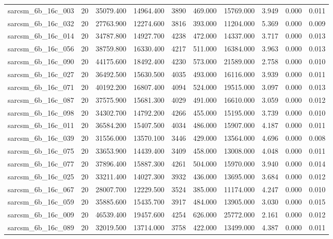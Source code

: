 \begin{tabular}{lrrrrrrrrr}
sarcsm\_6b\_16c\_003 & 20 & 35079.400 & 14964.400 & 3890 & 469.000 & 15769.000 & 3.949 & 0.000 & 0.011 \\
sarcsm\_6b\_16c\_032 & 20 & 27763.900 & 12274.600 & 3816 & 393.000 & 11204.000 & 5.369 & 0.000 & 0.009 \\
sarcsm\_6b\_16c\_014 & 20 & 34787.800 & 14927.700 & 4238 & 472.000 & 14337.000 & 3.717 & 0.000 & 0.013 \\
sarcsm\_6b\_16c\_056 & 20 & 38759.800 & 16330.400 & 4217 & 511.000 & 16384.000 & 3.963 & 0.000 & 0.013 \\
sarcsm\_6b\_16c\_090 & 20 & 44175.600 & 18492.400 & 4230 & 573.000 & 21589.000 & 2.758 & 0.000 & 0.010 \\
sarcsm\_6b\_16c\_027 & 20 & 36492.500 & 15630.500 & 4035 & 493.000 & 16116.000 & 3.939 & 0.000 & 0.011 \\
sarcsm\_6b\_16c\_071 & 20 & 40192.200 & 16807.400 & 4094 & 524.000 & 19515.000 & 3.097 & 0.000 & 0.013 \\
sarcsm\_6b\_16c\_087 & 20 & 37575.900 & 15681.300 & 4029 & 491.000 & 16610.000 & 3.059 & 0.000 & 0.012 \\
sarcsm\_6b\_16c\_098 & 20 & 34302.700 & 14792.200 & 4266 & 455.000 & 15195.000 & 3.739 & 0.000 & 0.010 \\
sarcsm\_6b\_16c\_011 & 20 & 36584.200 & 15407.500 & 4034 & 486.000 & 15907.000 & 4.187 & 0.000 & 0.011 \\
sarcsm\_6b\_16c\_039 & 20 & 31556.000 & 13570.100 & 3446 & 429.000 & 13564.000 & 4.696 & 0.000 & 0.008 \\
sarcsm\_6b\_16c\_075 & 20 & 33653.900 & 14439.400 & 3409 & 458.000 & 13008.000 & 4.048 & 0.000 & 0.011 \\
sarcsm\_6b\_16c\_077 & 20 & 37896.400 & 15887.300 & 4261 & 504.000 & 15970.000 & 3.940 & 0.000 & 0.014 \\
sarcsm\_6b\_16c\_025 & 20 & 33211.400 & 14027.300 & 3932 & 436.000 & 13695.000 & 3.684 & 0.000 & 0.012 \\
sarcsm\_6b\_16c\_067 & 20 & 28007.700 & 12229.500 & 3524 & 385.000 & 11174.000 & 4.247 & 0.000 & 0.010 \\
sarcsm\_6b\_16c\_059 & 20 & 35885.600 & 15435.700 & 3917 & 484.000 & 13905.000 & 3.030 & 0.000 & 0.015 \\
sarcsm\_6b\_16c\_009 & 20 & 46539.400 & 19457.600 & 4254 & 626.000 & 25772.000 & 2.161 & 0.000 & 0.012 \\
sarcsm\_6b\_16c\_089 & 20 & 32019.500 & 13714.000 & 3758 & 422.000 & 13499.000 & 4.387 & 0.000 & 0.011 \\

\end{tabular}
